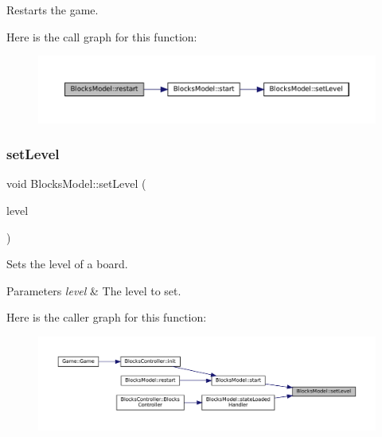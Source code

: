 Restarts the game. 

Here is the call graph for this function\+:
\nopagebreak
\begin{figure}[H]
\begin{center}
\leavevmode
\includegraphics[width=350pt]{class_blocks_model_a73cc9633752440b2060b5bb1f964d9e6_cgraph}
\end{center}
\end{figure}
\mbox{\label{class_blocks_model_aa5ca46eacee24fe51864845ecf6a1266}} 
\subsubsection{\texorpdfstring{setLevel}{setLevel}}
{\footnotesize\ttfamily void Blocks\+Model\+::set\+Level (\begin{DoxyParamCaption}\item[{const Game\+Level \&}]{level }\end{DoxyParamCaption})\hspace{0.3cm}{\ttfamily [slot]}}



Sets the level of a board. 


\begin{DoxyParams}{Parameters}
{\em level} & The level to set. \\
\hline
\end{DoxyParams}
Here is the caller graph for this function\+:
\nopagebreak
\begin{figure}[H]
\begin{center}
\leavevmode
\includegraphics[width=350pt]{class_blocks_model_aa5ca46eacee24fe51864845ecf6a1266_icgraph}
\end{center}
\end{figure}
\mbox{\label{class_blocks_model_a7e8f2f88ce1a2042772b50bf3d1321a2}} 
